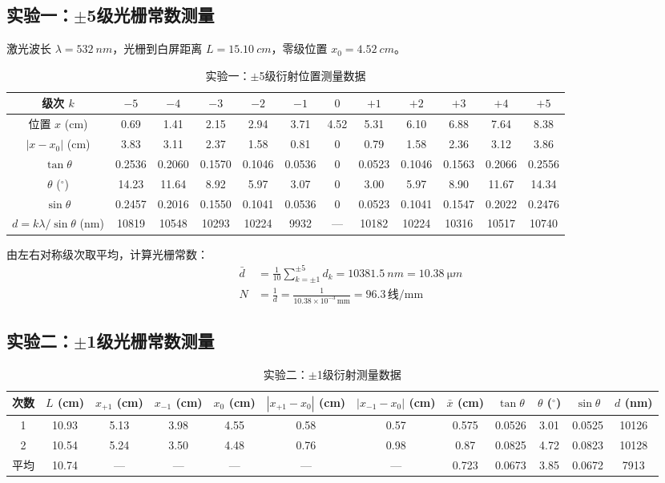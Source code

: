 \documentclass[12pt, a4paper]{article}
\begin{document}
\subsection{实验一：$\pm$5级光栅常数测量}

激光波长 $\lambda = \SI{532}{nm}$，光栅到白屏距离 $L = \SI{15.10}{cm}$，零级位置 $x_0 = \SI{4.52}{cm}$。

\begin{table}[H]
\centering
\caption{实验一：$\pm$5级衍射位置测量数据}
\begin{tabular}{cccccccccccc}
\toprule
级次 $k$ & $-5$ & $-4$ & $-3$ & $-2$ & $-1$ & $0$ & $+1$ & $+2$ & $+3$ & $+4$ & $+5$ \\
\midrule
位置 $x$ (cm) & 0.69 & 1.41 & 2.15 & 2.94 & 3.71 & 4.52 & 5.31 & 6.10 & 6.88 & 7.64 & 8.38 \\
$|x - x_0|$ (cm) & 3.83 & 3.11 & 2.37 & 1.58 & 0.81 & 0 & 0.79 & 1.58 & 2.36 & 3.12 & 3.86 \\
$\tan\theta$ & 0.2536 & 0.2060 & 0.1570 & 0.1046 & 0.0536 & 0 & 0.0523 & 0.1046 & 0.1563 & 0.2066 & 0.2556 \\
$\theta$ ($^\circ$) & 14.23 & 11.64 & 8.92 & 5.97 & 3.07 & 0 & 3.00 & 5.97 & 8.90 & 11.67 & 14.34 \\
$\sin\theta$ & 0.2457 & 0.2016 & 0.1550 & 0.1041 & 0.0536 & 0 & 0.0523 & 0.1041 & 0.1547 & 0.2022 & 0.2476 \\
$d = k\lambda/\sin\theta$ (nm) & 10819 & 10548 & 10293 & 10224 & 9932 & --- & 10182 & 10224 & 10316 & 10517 & 10740 \\
\bottomrule
\end{tabular}
\end{table}

由左右对称级次取平均，计算光栅常数：
\begin{align}
\bar{d} &= \frac{1}{10}\sum_{k=\pm 1}^{\pm 5} d_k = \SI{10381.5}{nm} = \SI{10.38}{\micro m} \\
N &= \frac{1}{d} = \frac{1}{10.38 \times 10^{-3}\,\text{mm}} = 96.3\,\text{线/mm}
\end{align}

\subsection{实验二：$\pm$1级光栅常数测量}

\begin{table}[H]
\centering
\caption{实验二：$\pm$1级衍射测量数据}
\begin{tabular}{cccccccccccc}
\toprule
次数 & $L$ (cm) & $x_{+1}$ (cm) & $x_{-1}$ (cm) & $x_0$ (cm) & $|x_{+1}-x_0|$ (cm) & $|x_{-1}-x_0|$ (cm) & $\bar{x}$ (cm) & $\tan\theta$ & $\theta$ ($^\circ$) & $\sin\theta$ & $d$ (nm) \\
\midrule
1 & 10.93 & 5.13 & 3.98 & 4.55 & 0.58 & 0.57 & 0.575 & 0.0526 & 3.01 & 0.0525 & 10126 \\
2 & 10.54 & 5.24 & 3.50 & 4.48 & 0.76 & 0.98 & 0.87 & 0.0825 & 4.72 & 0.0823 & 10128 \\
\midrule
平均 & 10.74 & --- & --- & --- & --- & --- & 0.723 & 0.0673 & 3.85 & 0.0672 & 7913 \\
\bottomrule
\end{tabular}
\end{table}
\end{document}
